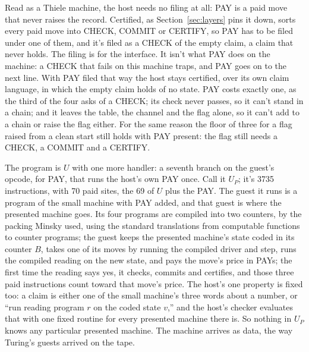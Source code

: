 \documentclass[11pt,twoside]{article}
\theoremstyle{thielethm}
\theoremstyle{thieledef}
\theoremstyle{thieledef}
\theoremstyle{thieledef}
\theoremstyle{thielethm}
\theoremstyle{thieleobs}
\theoremstyle{thielethm}
\begin{document}
Read as a Thiele machine, the host needs no filing at all: PAY is a paid move that never raises
the record. Certified, as Section~\ref{sec:layers} pins it down, sorts every paid move into CHECK, COMMIT or CERTIFY, so PAY
has to be filed under one of them, and it's filed as a CHECK of the empty claim, a claim that
never holds. The filing is for the interface. It isn't what PAY does on the machine: a CHECK
that fails on this machine traps, and PAY goes on to the next line. With PAY filed that way the
host stays certified, over its own claim
language, in which the empty claim holds of no state. PAY costs exactly one, as the third of the four asks
of a CHECK; its check never passes, so it can't stand in a chain; and it leaves the table, the
channel and the flag alone, so it can't add to a chain or raise the flag either. For the same
reason the floor of three for a flag raised from a clean start still holds with PAY present: the
flag still needs a CHECK, a COMMIT and a CERTIFY.

The program is $U$ with one more handler: a seventh branch on the guest's opcode, for PAY, that
runs the host's own PAY once. Call it $U_P$; it's 3735 instructions, with 70 paid sites, the 69
of $U$ plus the PAY. The guest it runs is a program of the small machine with PAY added, and that
guest is where the presented machine goes. Its four programs are compiled into two counters, by
the packing Minsky used, using the standard translations from computable
functions to counter programs; the guest keeps the presented machine's state coded in its
counter $B$, takes one of its moves by running the compiled driver and step, runs the compiled
reading on the new state, and pays the move's price in PAYs; the first time the reading says yes,
it checks, commits and certifies, and those three paid instructions count toward that move's price. The host's one property
is fixed too: a claim is either one of the small machine's three words about a number, or ``run
reading program $r$ on the coded state $v$,'' and the host's checker evaluates that with one
fixed routine for every presented machine there is. So nothing in $U_P$ knows any particular
presented machine. The machine arrives as data, the way Turing's guests arrived on the tape.
\end{document}
